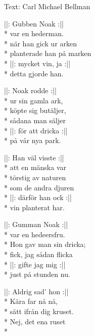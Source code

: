 \begin{SongText}
    \begin{SongInfo}
        Text: Carl Michael Bellman
    \end{SongInfo}
    \begin{SongVerse}
        ||: Gubben Noak :||\\*%
        var en hederman.\\*%
        när han gick ur arken\\*%
        planterade han på marken\\*%
        ||: mycket vin, ja :||\\*%
        detta gjorde han.
    \end{SongVerse}
    \begin{SongVerse}
        ||: Noak rodde :||\\*%
        ur sin gamla ark,\\*%
        köpte sig butäljer,\\*%
        sådana man säljer\\*%
        ||: för att dricka :||\\*%
        på vår nya park.
    \end{SongVerse}
    \begin{SongVerse}
        ||: Han väl visste :||\\*%
        att en mänska var\\*%
        törstig av naturen\\*%
        som de andra djuren\\*%
        ||: därför han ock :||\\*%
        vin planterat har.
    \end{SongVerse}
    \begin{SongVerse}
        ||: Gumman Noak :||\\*%
        var en hedeersfru.\\*%
        Hon gav man sin dricka;\\*%
        fick, jag sådan flicka\\*%
        ||: gifte jag mig :||\\*%
        just på stunden nu.
    \end{SongVerse}
    \begin{SongVerse}
        ||: Aldrig sad’ hon :||\\*%
        Kära far nå nå,\\*%
        sätt ifrån dig kruset.\\*%
        Nej, det ena ruset\\*%

\end{SongVerse}
\end{SongText}
